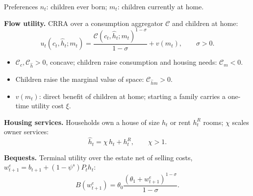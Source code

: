 \begin{frame}{Preferences}
\footnotesize
\setlength{\abovedisplayskip}{2pt}\setlength{\belowdisplayskip}{2pt}
$n_t$: children ever born; $m_t$: children currently at home.

\smallskip
\textbf{Flow utility.} CRRA over a consumption aggregator $\mathcal C$ and children at home:
\[
u_t(c_t,\hat h_t;m_t)=\frac{\mathcal C(c_t,\hat h_t;m_t)^{1-\sigma}}{1-\sigma}+v(m_t),\qquad \sigma>0.
\]
\begin{itemize}\setlength\itemsep{1pt}
  \item $\mathcal C_c,\mathcal C_{\hat h}>0$, concave; children raise consumption and housing needs: $\mathcal C_m<0$.
  \item Children raise the marginal value of space: $\mathcal C_{\hat h m}>0$.
  \item $v(m_t)$: direct benefit of children at home; starting a family carries a one-time utility cost $\xi$.
\end{itemize}

\smallskip
\textbf{Housing services.} Households own a house of size $h_t$ or rent $h_t^R$ rooms; $\chi$ scales owner services:
\[
\hat h_t=\chi\,h_t+h_t^R,\qquad \chi>1.
\]

\smallskip
\textbf{Bequests.} Terminal utility over the estate net of selling costs, $w^e_{t+1}=b_{t+1}+(1-\psi^s)P_t h_t$:
\[
B(w_{t+1}^e)=\theta_0\frac{(\theta_1+w_{t+1}^e)^{1-\sigma}}{1-\sigma}.
\]
\end{frame}

